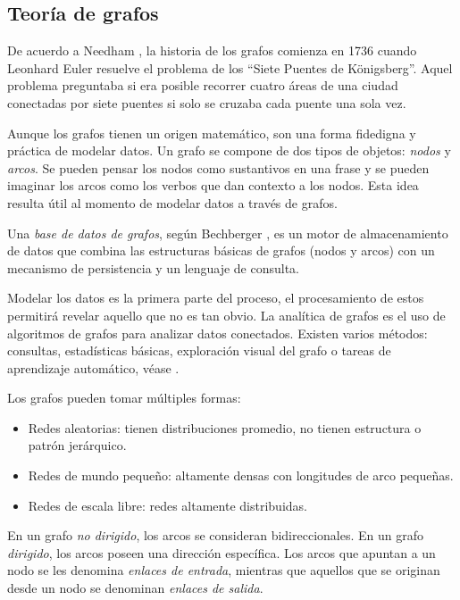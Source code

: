 \documentclass[11pt,letterpaper,oneside]{article}
\begin{document}
	\newpage
	
	\subsection{Teoría de grafos}
	De acuerdo a Needham \cite{Needham-2019}, la historia de los grafos comienza en 1736 cuando Leonhard Euler resuelve el problema de los ``Siete Puentes de K\"{o}nigsberg''. Aquel problema preguntaba si era posible recorrer cuatro áreas de una ciudad conectadas por siete puentes si solo se cruzaba cada puente una sola vez.
	
	Aunque los grafos tienen un origen matemático, son una forma fidedigna y práctica de modelar datos. Un grafo se compone de dos tipos de objetos: \textit{nodos} y \textit{arcos}. Se pueden pensar los nodos como sustantivos en una frase y se pueden imaginar los arcos como los verbos que dan contexto a los nodos. Esta idea resulta útil al momento de modelar datos a través de grafos.
	
	Una \textit{base de datos de grafos}, según Bechberger \cite{Bechberger-2020}, es un motor de almacenamiento de datos que combina las estructuras básicas de grafos (nodos y arcos) con un mecanismo de persistencia y un lenguaje de consulta.
	
	Modelar los datos es la primera parte del proceso, el procesamiento de estos permitirá revelar aquello que no es tan obvio. La analítica de grafos es el uso de algoritmos de grafos para analizar datos conectados. Existen varios métodos: consultas, estadísticas básicas, exploración visual del grafo o tareas de aprendizaje automático, véase \cite{Robinson-2013}.
	
	Los grafos pueden tomar múltiples formas:
	\begin{itemize}
	\item Redes aleatorias: tienen distribuciones promedio, no tienen estructura o patrón jerárquico.
	\item Redes de mundo pequeño: altamente densas con longitudes de arco pequeñas.
	\item Redes de escala libre: redes altamente distribuidas.
	\end{itemize}
	
	
	En un grafo \textit{no dirigido}, los arcos se consideran bidireccionales. En un grafo \textit{dirigido}, los arcos poseen una dirección específica. Los arcos que apuntan a un nodo se les denomina \textit{enlaces de entrada}, mientras que aquellos que se originan desde un nodo se denominan \textit{enlaces de salida}.
	
\end{document}
